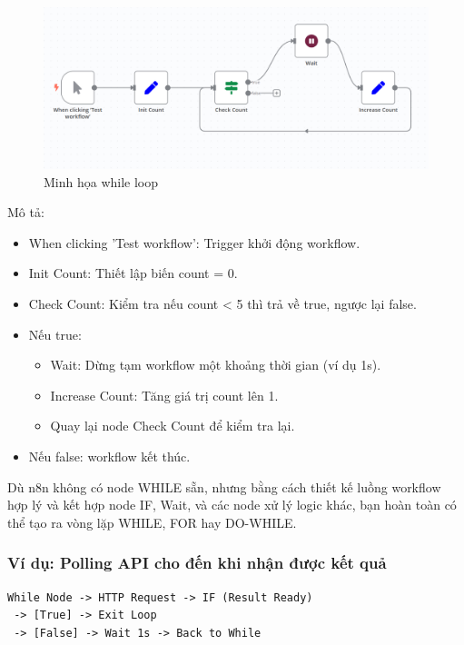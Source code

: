 \begin{figure}[htbp]
    \centering
    \includegraphics[width=1\linewidth]{Chap1-7/While-loop.pdf}
    \caption{Minh họa while loop}
\end{figure}
Mô tả:
\begin{itemize}
    \item When clicking 'Test workflow': Trigger khởi động workflow.

    \item Init Count: Thiết lập biến count = 0.

    \item Check Count: Kiểm tra nếu count < 5 thì trả về true, ngược lại false.

    \item Nếu true:
\begin{itemize}
    \item Wait: Dừng tạm workflow một khoảng thời gian (ví dụ 1s).

    \item Increase Count: Tăng giá trị count lên 1.

    \item Quay lại node Check Count để kiểm tra lại.

\end{itemize}
    \item Nếu false: workflow kết thúc.

\end{itemize}

Dù n8n không có node WHILE sẵn, nhưng bằng cách thiết kế luồng workflow hợp lý và kết hợp node IF, Wait, và các node xử lý logic khác, bạn hoàn toàn có thể tạo ra vòng lặp WHILE, FOR hay DO-WHILE.

\subsubsection{Ví dụ: Polling API cho đến khi nhận được kết quả}

\begin{verbatim}
While Node -> HTTP Request -> IF (Result Ready) 
 -> [True] -> Exit Loop
 -> [False] -> Wait 1s -> Back to While
\end{verbatim}


